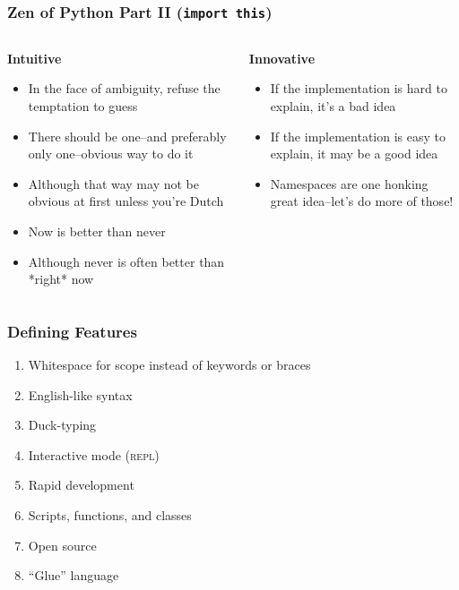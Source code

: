 \documentclass{beamer}
\begin{document}
\begin{frame}
  \frametitle{Zen of Python Part II (\texttt{import this})}
  \begin{columns}
  \begin{column}{0.60\textwidth}
    \textbf{Intuitive}
    \begin{itemize}
      \item In the face of ambiguity, refuse the temptation to guess
      \item There should be one--and preferably only one--obvious way to do it
      \item Although that way may not be obvious at first unless you're Dutch
      \item Now is better than never
      \item Although never is often better than *right* now
    \end{itemize}
  \end{column}
  \begin{column}{0.40\textwidth}
    \textbf{Innovative}
    \begin{itemize}
      \item If the implementation is hard to explain, it's a bad idea
      \item If the implementation is easy to explain, it may be a good idea
      \item Namespaces are one honking great idea--let's do more of those!
    \end{itemize}
  \end{column}
 \end{columns}
\end{frame}


\begin{frame}
  \frametitle{Defining Features}
  \begin{enumerate}
    \item Whitespace for scope instead of keywords or braces
    \item English-like syntax
    \item Duck-typing
    \item Interactive mode (\textsc{repl})
    \item Rapid development
    \item Scripts, functions, and classes
    \item Open source
    \item ``Glue'' language
  \end{enumerate}
\end{frame}
\end{document}
